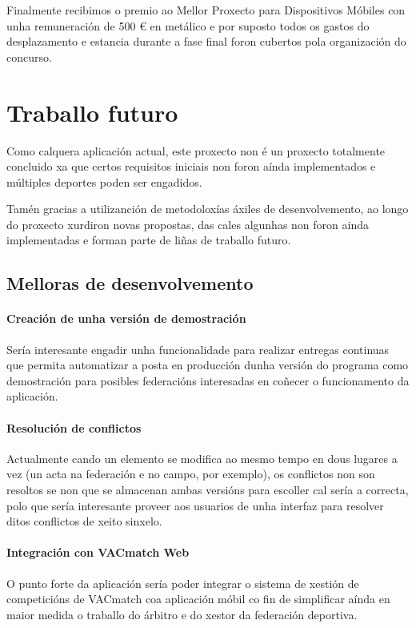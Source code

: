   Finalmente recibimos o premio ao Mellor Proxecto para Dispositivos Móbiles 
con unha remuneración de 500 \euro{} en metálico e por suposto todos os gastos 
do desplazamento e estancia durante a fase final foron cubertos pola 
organización do concurso.

\section{Traballo futuro}
Como calquera aplicación actual, este proxecto non é un proxecto totalmente 
concluido xa que certos requisitos iniciais non foron aínda implementados e 
múltiples deportes poden ser engadidos.

Tamén gracias a utilizanción de metodoloxías áxiles de desenvolvemento, ao 
longo do proxecto xurdiron novas propostas, das cales algunhas non foron 
ainda implementadas e forman parte de liñas de traballo futuro.

  \subsection{Melloras de desenvolvemento}

    \paragraph{Creación de unha versión de demostración} Sería interesante 
engadir unha funcionalidade para realizar entregas continuas que permita 
automatizar a posta en producción dunha versión do programa como demostración 
para posibles federacións interesadas en coñecer o funcionamento da aplicación.

    \paragraph{Resolución de conflictos} Actualmente cando un elemento se 
modifica ao mesmo tempo en dous lugares a vez (un acta na federación e no 
campo, por exemplo), os conflictos non son resoltos se non que se almacenan 
ambas versións para escoller cal sería a correcta, polo que sería interesante 
proveer aos usuarios de unha interfaz para resolver ditos conflictos de xeito 
sinxelo.

    \paragraph{Integración con VACmatch Web} O punto forte da aplicación sería 
poder integrar o sistema de xestión de competicións de VACmatch coa aplicación 
móbil co fin de simplificar aínda en maior medida o traballo do árbitro e do 
xestor da federación deportiva. 

